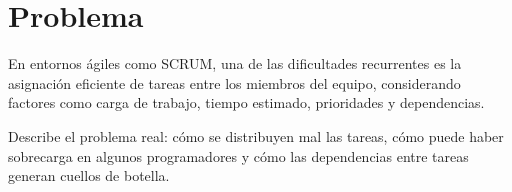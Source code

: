 \section{Problema}
En entornos ágiles como SCRUM, una de las dificultades recurrentes es la asignación eficiente de tareas entre los miembros del equipo, considerando factores como carga de trabajo, tiempo estimado, prioridades y dependencias.
\vspace{0.5cm}

\begin{tcolorbox}[colback=gray!10, colframe=black!30, title={Sugerencia para esta sección}]
    Describe el problema real: cómo se distribuyen mal las tareas, cómo puede haber sobrecarga en algunos programadores y cómo las dependencias entre tareas generan cuellos de botella.
\end{tcolorbox}
